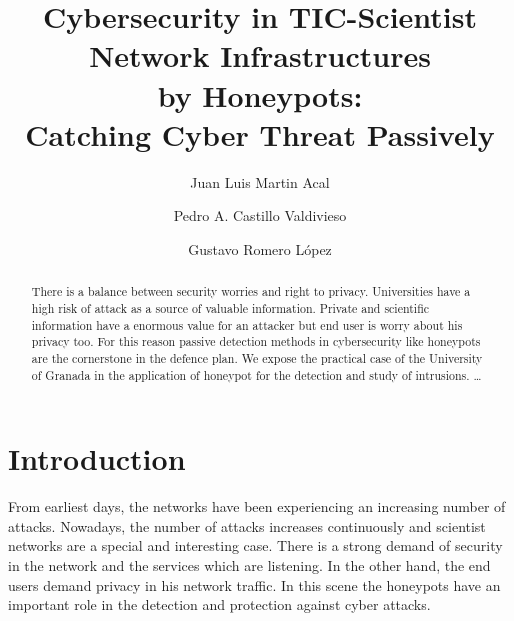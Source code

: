 \documentclass[a4paper]{llncs}
\begin{document}
\pagestyle{empty}

\mainmatter

\title{Cybersecurity in TIC-Scientist Network Infrastructures\\by Honeypots:\\Catching Cyber Threat Passively}


\author{Juan Luis Martin Acal \and Pedro A. Castillo Valdivieso
\and Gustavo Romero López}



\maketitle

\begin{abstract}
There is a balance between security worries and right to privacy. Universities have a high risk of attack as a source of valuable information. Private and scientific information have a enormous value for an attacker but end user is worry about his privacy too. For this reason passive detection methods in cybersecurity like honeypots are the cornerstone in the defence plan. We expose the practical case of the University of Granada in the application of honeypot for the detection and study of intrusions.
\dots
\end{abstract}


\section{Introduction}

From earliest days, the networks have been experiencing an increasing number of attacks. Nowadays, the number of attacks increases continuously and scientist networks are a special and interesting case. There is a strong demand of security in the network and the services which are listening. In the other hand, the end users demand privacy in his network traffic. In this scene the honeypots have an important role in the detection and protection against cyber attacks.
\end{document}
